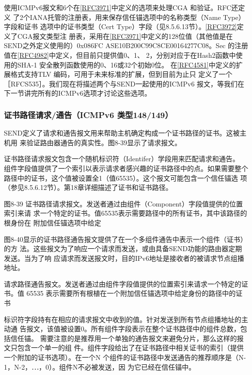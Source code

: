 使用ICMPv6报文和6个在\href{https://www.rfc-editor.org/rfc/rfc3971}{[RFC3971]}中定义的选项来处理CGA 和验证。RFC还定义
了2个IANA托管的注册表，用来保存信任锚选项中的名称类型（Name Type）字段和证书
选项中的证书类型（Cert Type）字段（见8.5.6.13节）。\href{https://www.rfc-editor.org/rfc/rfc3972}{[RFC3972]}定义了CGA报文类型注
册表，采用在\href{https://www.rfc-editor.org/rfc/rfc3971}{[RFC3971]}中定义的128位值（其他值是在SEND之外定义使用的）0x086FC
ASE10B200C99C8CE00164277C08。Sec 的注册值在\href{https://www.rfc-editor.org/rfc/rfc4982}{[RFC4982]}中定义，但目前只提供值0、1、
2，分别对应于在Hash2函数中使用的SHA-1 安全散列函数使用的0、16或32个初始0位。
在\href{https://www.rfc-editor.org/rfc/rfc4581}{[RFC4581]}中定义的扩展格式支持TLV 编码，可用于未来标准的扩展，但到目前为止只
定义了一个［RFCS535］。我们现在将描述两个与SEND一起使用的ICMPv6 报文，等我们在
下一节讲完所有的ICMPv6选项才讨论这些选项。

\subsubsection{证书路径请求/通告（ICMPv6 类型148/149）}
SEND定义了请求和通告报文用来帮助主机确定构成一个证书路径的证书。这被主机用
来验证路由器通告的真实性。图8-39显示了请求报文。

证书路径请求报文包含一个随机标识符（Identifer）学段用来匹配请求和通告。
组件字段值提供了一个索引以表示请求者感兴趣的证书路径中的点。如果需要整个
路径中的证书，这个值被设置全1（值65535）。这个报文可能包含一个信任锚选
项（参见8.5.6.12节）。第18章详细描述了证书和证书路径。

图8-39 证书路径请求报文。发送者通过由组件（Component）字段值提供的位置索引来请
求一个特定的证书。值65535表示需要路径中的所有证书，其中该路径的根身份在
附加信任锚选项中给定

图8-40显示的证书路径通告报文提供了在一个多组件通告中表示一个组件（证书）的方
法。这些报文为了响应一个请求而发送，或由具备SEND功能的路由器定期发送。当为了响
应请求而发送报文时，目的IPv6地址是接收者的被请求节点组播地址。

请求路径通告报文。发送者通过由组件字段值提供的位置索引来请求一个特定的证书。值
65535 表示需要所有根植在一个附加信任锚选项中给定身份的路径中的证书

标识符字段持有在相应的请求报文中收到的值。针对发送到所有节点组播地址的主动通
告报文，该值被设置0。所有组件字段表示在整个证书路径中的组件总数，包括信任锚。
需要注意的是推荐用一个单独的通告报文来避免分片，那么这样的报文只包含一个单一的组
件。组件字段给出了在证书路径中相关证书的索引（提供一个附加的证书选项）。在一个N
个组件的证书路径中发送通告的推荐顺序是（N-1，N-2，⋯，0）。组件N不必被发送，因
为它已经在信任锚中。

